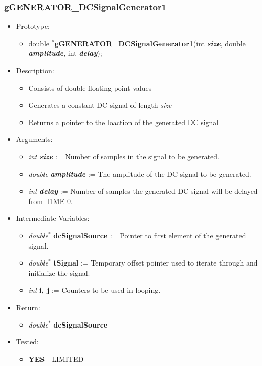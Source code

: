 \documentclass{article}
\begin{document}
{{%
\cleardoublepage
\subsubsection{gGENERATOR\_DCSignalGenerator1}
{\renewcommand{\labelitemi}{$\bullet$}
\begin{itemize}
\item Prototype:
	\begin{itemize}
	\item double $^{\ast}$\textbf{gGENERATOR\_DCSignalGenerator1}(int \textit{\textbf{size}}, double \textit{\textbf{amplitude}}, int \textit{\textbf{delay}});
	\end{itemize}
\item Description:
	\begin{itemize}[noitemsep]
	\item Consists of double floating-point values
	\item Generates a constant DC signal of length \textit{size}
	\item Returns a pointer to the loaction of the generated DC signal
	\end{itemize}
\item Arguments:
	\begin{itemize}[noitemsep]
	\item \textit{int} \textit{\textbf{size}} := Number of samples in the signal to be generated.
	\item \textit{double} \textit{\textbf{amplitude}} := The amplitude of the DC signal to be generated.
	\item \textit{int} \textit{\textbf{delay}} := Number of samples the generated DC signal will be delayed from TIME 0.
	\end{itemize} 
\item Intermediate Variables:
	\begin{itemize}[noitemsep]
	\item \textit{double$^{\ast}$} \textbf{dcSignalSource} := Pointer to first element of the generated signal.
	\item \textit{double$^{\ast}$} \textbf{tSignal} := Temporary offset pointer used to iterate through and initialize the signal.
	\item \textit{int} \textbf{i, j} := Counters to be used in looping.
	\end{itemize}
\item Return:
	\begin{itemize}
	\item \textit{double$^{\ast}$} \textbf{dcSignalSource}
	\end{itemize}
\item Tested:
	\begin{itemize}
	\item \textbf{YES} - LIMITED
	\end{itemize}
\end{itemize}

}}}
\end{document}

